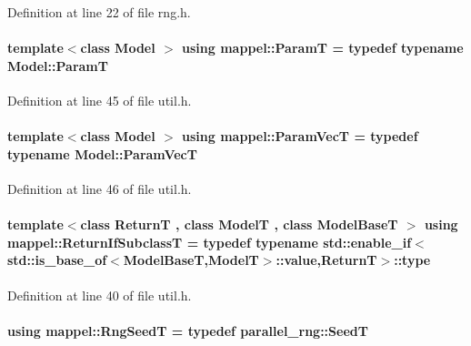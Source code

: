 Definition at line 22 of file rng.\+h.

\paragraph[{\texorpdfstring{ParamT}{ParamT}}]{\setlength{\rightskip}{0pt plus 5cm}template$<$class Model $>$ using {\bf mappel\+::\+ParamT} = typedef typename Model\+::\+ParamT}\hypertarget{namespacemappel_a667925cb0d6c0e49f2f035cc5a9a6857}{}\label{namespacemappel_a667925cb0d6c0e49f2f035cc5a9a6857}


Definition at line 45 of file util.\+h.

\paragraph[{\texorpdfstring{Param\+VecT}{ParamVecT}}]{\setlength{\rightskip}{0pt plus 5cm}template$<$class Model $>$ using {\bf mappel\+::\+Param\+VecT} = typedef typename Model\+::\+Param\+VecT}\hypertarget{namespacemappel_a0f86d3153e4e27b095012f140eea58de}{}\label{namespacemappel_a0f86d3153e4e27b095012f140eea58de}


Definition at line 46 of file util.\+h.

\paragraph[{\texorpdfstring{Return\+If\+SubclassT}{ReturnIfSubclassT}}]{\setlength{\rightskip}{0pt plus 5cm}template$<$class ReturnT , class ModelT , class Model\+BaseT $>$ using {\bf mappel\+::\+Return\+If\+SubclassT} = typedef typename std\+::enable\+\_\+if$<$std\+::is\+\_\+base\+\_\+of$<$Model\+BaseT,ModelT$>$\+::value,ReturnT$>$\+::type}\hypertarget{namespacemappel_a3b77d227658ba3ba9e16fea6fa6e626d}{}\label{namespacemappel_a3b77d227658ba3ba9e16fea6fa6e626d}


Definition at line 40 of file util.\+h.

\paragraph[{\texorpdfstring{Rng\+SeedT}{RngSeedT}}]{\setlength{\rightskip}{0pt plus 5cm}using {\bf mappel\+::\+Rng\+SeedT} = typedef parallel\+\_\+rng\+::\+SeedT}\hypertarget{namespacemappel_a318bca259a7add5979160939a3f4e60b}{}\label{namespacemappel_a318bca259a7add5979160939a3f4e60b}


